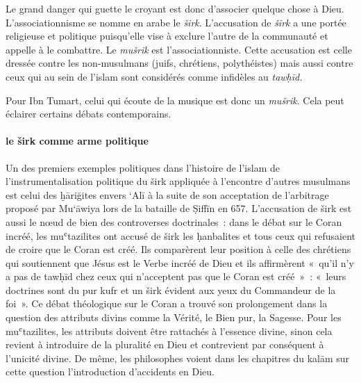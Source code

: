 Le grand danger qui guette le croyant est donc d'associer quelque chose
à Dieu. L'associationnisme se nomme en arabe le \emph{širk}.
L'accusation de \emph{širk} a une portée religieuse et politique
puisqu'elle vise à exclure l'autre de la communauté et appelle à le
combattre. Le \emph{mušrik} est l'associationniste. Cette accusation est
celle dressée contre les non-musulmans (juifs, chrétiens, polythéistes)
mais aussi contre ceux qui au sein de l'islam sont considérés comme
infidèles au \emph{tawḥīd.}


Pour Ibn Tumart, celui qui écoute de la musique est donc un
\emph{mušrik}. Cela peut éclairer certains débats contemporains.

\paragraph{le širk comme arme politique}

Un des premiers exemples politiques dans l'histoire de l'islam de
l'instrumentalisation politique du širk appliquée à l'encontre d'autres
musulmans est celui des ḫāriğites envers `Alī à la suite de son
acceptation de l'arbitrage proposé par Mu`āwiya lors de la bataille de
Ṣiffīn en 657.
L'accusation de širk est aussi le nœud de bien des controverses
doctrinales~: dans le débat sur le Coran incréé, les muʿtazilites ont
accusé de širk les ḥanbalites et tous ceux qui refusaient de croire que
le Coran est créé. Ils comparèrent leur position à celle des chrétiens
qui soutiennent que Jésus est le Verbe incréé de Dieu et ils affirmèrent
«~qu'il n'y a pas de tawḥīd chez ceux qui n'acceptent pas que le Coran
est créé~»~: «~leurs doctrines sont du pur kufr et un širk évident aux
yeux du Commandeur de la foi~». Ce débat
théologique sur le Coran a trouvé son prolongement dans la question des
attributs divins comme la Vérité, le Bien pur, la Sagesse. Pour les
muʿtazilites, les attributs doivent être rattachés à l'essence divine,
sinon cela revient à introduire de la pluralité en Dieu et contrevient
par conséquent à l'unicité divine. De même, les philosophes voient dans
les chapitres du kalām sur cette question l'introduction d'accidents en
Dieu.

